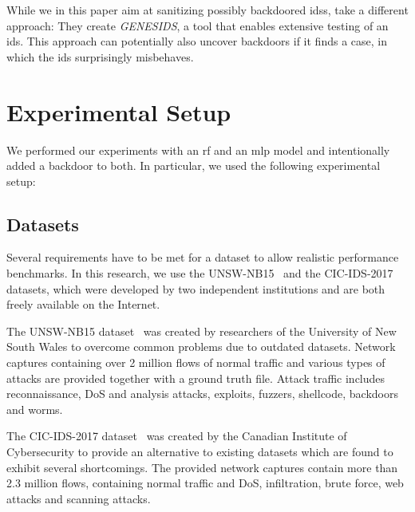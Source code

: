 \documentclass[9pt,sigconf,letterpaper,dvipsnames\ifx\removeHeaders\tempYes ,nonacm\fi]{acmart}
\newcommand\note[2]{{\color{#1}#2}}
\newcommand\todo[1]{{\note{red}{TODO: #1}}}
\newcommand{\unsw}{UNSW-NB15}
\newcommand{\cic}{CIC-IDS-2017}
\begin{document}
While we in this paper aim at sanitizing possibly backdoored \glspl{ids}, \cite{erlacher_how_2018} take a different approach: They create \textit{GENESIDS}, a tool that enables extensive testing of an \gls{ids}. This approach can potentially also uncover backdoors if it finds a case, in which the \gls{ids} surprisingly misbehaves. 

\section{Experimental Setup} \label{sec:ml_approaches}
We performed our experiments with an \gls{rf} and an \gls{mlp} model and intentionally added a backdoor to both. In particular, we used the following experimental setup:
\subsection{Datasets}

Several requirements have to be met for a dataset to allow realistic performance benchmarks. %
In this research, we use the \unsw{}~\cite{moustafa_unsw-nb15:_2015} and the \cic{}~\cite{sharafaldin_toward_2018} datasets, which were developed by two independent institutions and are both freely available on the Internet. %

The \unsw{} dataset~\cite{moustafa_unsw-nb15:_2015} was created by researchers of the University of New South Wales to overcome common problems due to outdated datasets. Network captures containing over 2 million flows of normal traffic and various types of attacks are provided together with a ground truth file. Attack traffic includes reconnaissance, DoS and analysis attacks, exploits, fuzzers,  shellcode, backdoors and worms.

The \cic{} dataset~\cite{sharafaldin_toward_2018} was created by the Canadian Institute of Cybersecurity to provide an alternative to existing datasets which are found to exhibit several shortcomings. The provided network captures contain more than 2.3 million flows, containing normal traffic and DoS, infiltration,  brute force, web attacks and scanning attacks.
\end{document}
